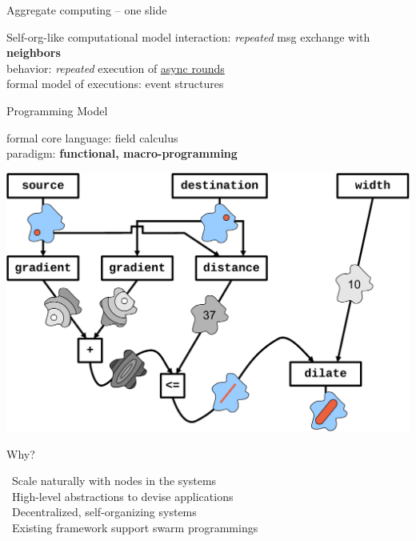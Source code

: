 \documentclass[aspectratio=169]{beamer}
\newcommand{\hsplit}[2]{
\begin{minipage}{0.48\textwidth}
#1
\end{minipage}
\hfill
\begin{minipage}{0.48\textwidth}
#2
\end{minipage}
}
\newcommand{\lbl}[1]{\textbf{\textcolor{gray!90!white}{#1}}}
\newcommand{\bo}[1]{\textbf{#1}}
\begin{document}
\begin{frame}[fragile]{Aggregate computing -- one slide}
	
	\hsplit{

  \begin{exampleblock}{\footnotesize Self-org-like computational model}
		\scriptsize
		\alert{interaction:} \emph{repeated} msg exchange with \bo{neighbors}
		\\[-0.05cm]%
		\alert{behavior:} \emph{repeated} execution of \underline{async rounds}%
		\\[-0.05cm]%
		\alert{formal model of executions:} event structures 
	\end{exampleblock}
	\begin{exampleblock}{\footnotesize Programming Model}
	\scriptsize

	\alert{formal core language:} field calculus
	\\[-0.05cm]
	\alert{paradigm:} \bo{functional, macro-programming}

	\centering
	\includegraphics[height=0.33\textheight]{img/channel.pdf}
	\end{exampleblock}	
		}{
		\begin{exampleblock}{\footnotesize Why?}
			\scriptsize
		
			\alert{\faThumbsUp} \, Scale naturally with nodes in the systems\\[-0.05cm]
			\alert{\faThumbsUp} \, High-level abstractions to devise applications
			\\[-0.05cm]
			\alert{\faThumbsUp} \, Decentralized, self-organizing systems
			\\[-0.05cm]
			\alert{\faThumbsUp} \, Existing framework support swarm programmings
		\end{exampleblock}
		
}
\end{frame}
\end{document}
